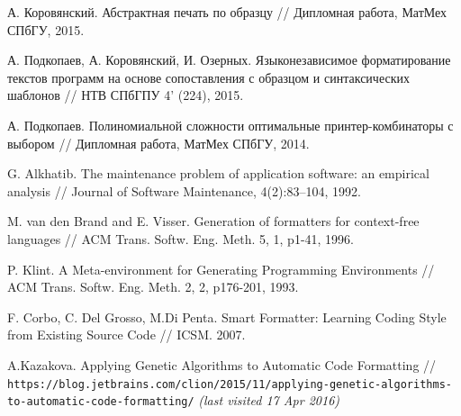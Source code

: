 \documentclass[conference]{IEEEtran}
\begin{document}
\begin{thebibliography}{4}

  А. Коровянский. Абстрактная печать по образцу
  // Дипломная работа, МатМех СПбГУ, 2015.

  А. Подкопаев, А. Коровянский, И. Озерных.
  Языконезависимое форматирование текстов программ
  на основе сопоставления с образцом и синтаксических шаблонов
  // НТВ СПбГПУ 4' (224), 2015.

  А. Подкопаев. Полиномиальной сложности оптимальные принтер-комбинаторы с выбором
  // Дипломная работа, МатМех СПбГУ, 2014.
  
  G. Alkhatib.
  The maintenance problem of application software:
an empirical analysis //
  Journal of Software Maintenance, 4(2):83–104, 1992.
  
 M. van den Brand and E. Visser.
Generation of formatters for context-free languages //
ACM Trans. Softw. Eng. Meth. 5, 1, p1-41, 1996.

 P. Klint. A Meta-environment for Generating Programming Environments //
ACM Trans. Softw. Eng. Meth. 2, 2, p176-201, 1993.


 F. Corbo, C. Del Grosso, M.Di Penta.
Smart Formatter: Learning Coding Style from Existing Source Code //
ICSM. 2007.

 A.Kazakova.
Applying Genetic Algorithms to Automatic Code Formatting
// \texttt{https://blog.jetbrains.com/clion/2015/11/applying-genetic-algorithms-to-automatic-code-formatting/}
\emph{(last visited 17 Apr 2016)}
\end{thebibliography}
\end{document}
